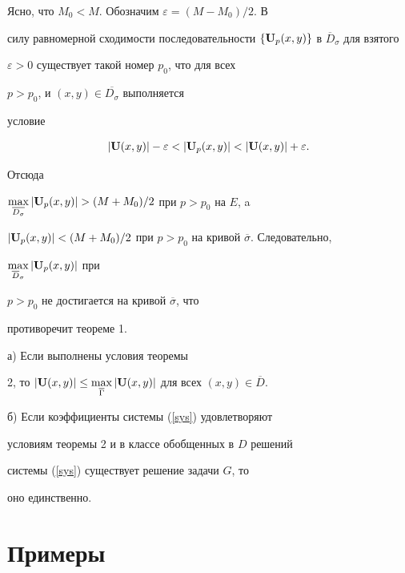 \begin{pf}
Ясно, что $M_0<M$. Обозначим $\varepsilon=(M-M_0)/2$. В


силу равномерной сходимости последовательности $\{{\bold


U}_{p}(x,y)\}$ в $\overline D_\sigma$ для взятого


$\varepsilon>0$ существует такой номер $p_0$, что для всех


$p>p_0$, и $(x,y)\in \overline {D_{\sigma}}$ выполняется


условие


$$


|{\bold U}(x,y)|-\varepsilon<|{\bold


U}_p(x,y)|<|{\bold U}(x,y)|+\varepsilon.


$$


Отсюда 


$\max\limits_{\overline {D_{\sigma}}}|{\bold


U}_p(x,y)|>(M+M_0)/2$ при $p>p_0$ на $E$, a


$|{\bold U}_p(x,y)|<(M+M_0)/2$ при $p>p_0$ на кривой $\overline


\sigma$. Следовательно,


$\max\limits_{\overline D_\sigma}|{\bold U}_p(x,y)|$ при


$p>p_0$ не достигается на кривой $\overline\sigma$, что


противоречит теореме 1.


\end{pf}





\begin{cor}


а) Если выполнены условия теоремы


2, то $|{\bold U}(x,y)|\le \max \limits_{\overline \Gamma}


|{\bold U}(x,y)|$ для всех $(x,y)\in \overline D$.





б) Если коэффициенты системы (\ref{sys}) удовлетворяют


условиям теоремы 2 и в классе обобщенных в $D$ решений


системы (\ref{sys}) существует решение задачи $G$, то


оно единственно.


\end{cor}





\section{Примеры}





